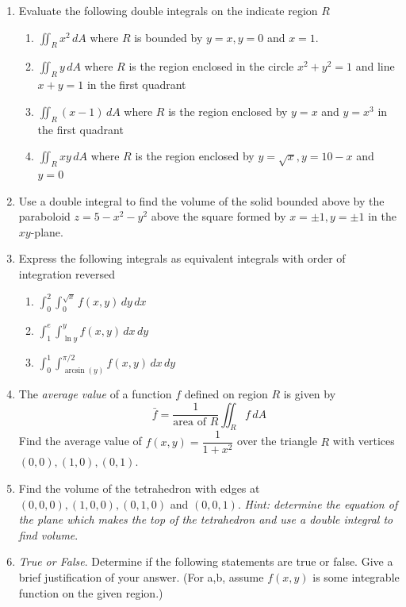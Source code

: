 \documentclass[12pt]{article}
\numberwithin{equation}{subsection}
\numberwithin{figure}{subsection}
\theoremstyle{note}
\begin{document}
{\begin{enumerate}[label=\arabic*.]
\item Evaluate the following double integrals on the indicate region $R$

\begin{enumerate}
	\item $\displaystyle \iint_R x^2\, dA$ where $R$ is bounded by $y=x, y=0$ and $x=1$. 
	\item $\displaystyle \iint_R y\,dA$ where $R$ is the region enclosed in the circle $x^2+y^2=1$ and line $x+y=1$ in the first quadrant
	\item $\displaystyle \iint_R (x-1) \,dA$ where $R$ is the region enclosed by $y=x$ and $y=x^3$ in the first quadrant
	\item $\displaystyle \iint_R xy\,dA$ where $R$ is the region enclosed by $y=\sqrt{x}, y=10-x$ and $y=0$
\end{enumerate}

\item Use a double integral to find the volume of the solid bounded above by the paraboloid $z=5-x^2-y^2$ above the square formed by $x=\pm 1, y=\pm 1$ in the $xy$-plane.

\item Express the following integrals as equivalent integrals with order of integration reversed 

\begin{enumerate}
	\item $\displaystyle \int_0^2 \int_0^{\sqrt{x}} f(x,y)\,dy\,dx$
	\item $\displaystyle \int_1^e \int_{\ln y}^{y} f(x,y)\,dx\,dy$
	\item $\displaystyle \int_0^1 \int_{\arcsin(y)}^{\pi/2} f(x,y)\,dx\,dy$
\end{enumerate}

\item The \textit{average value} of a function $f$ defined on region $R$ is given by \begin{equation} \bar{f}=\dfrac{1}{\text{area of $R$}} \iint_R f\,dA\end{equation}
Find the average value of $f(x,y)=\dfrac{1}{1+x^2}$ over the triangle $R$ with vertices $(0,0), (1,0), (0,1)$.

\item Find the volume of the tetrahedron with edges at $(0,0,0), (1,0,0), (0,1,0)$ and $(0,0,1)$. \textit{Hint: determine the equation of the plane which makes the top of the tetrahedron and use a double integral to find volume}. 


\item \textit{True or False}. Determine if the following statements are true or false. Give a brief justification of your answer. (For a,b, assume $f(x,y)$ is some integrable function on the given region.)


\end{enumerate}}
\end{document}
